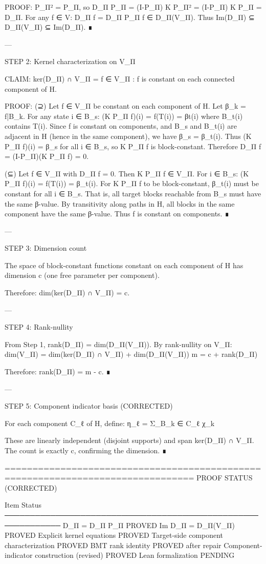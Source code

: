 PROOF: P_Π² = P_Π, so D_Π P_Π = (I-P_Π) K P_Π² = (I-P_Π) K P_Π = D_Π.
For any f ∈ V: D_Π f = D_Π P_Π f ∈ D_Π(V_Π).
Thus Im(D_Π) ⊆ D_Π(V_Π) ⊆ Im(D_Π). ∎


---

STEP 2: Kernel characterization on V_Π

CLAIM: ker(D_Π) ∩ V_Π = {f ∈ V_Π : f is constant on each connected component of H}.

PROOF:
(⊇) Let f ∈ V_Π be constant on each component of H. Let β_k = f|{B_k}.
For any state i ∈ B_s: (K P_Π f)(i) = f(T(i)) = β{t(i)} where B_{t(i)} contains T(i).
Since f is constant on components, and B_s and B_{t(i)} are adjacent in H
(hence in the same component), we have β_s = β_{t(i)}.
Thus (K P_Π f)(i) = β_s for all i ∈ B_s, so K P_Π f is block-constant.
Therefore D_Π f = (I-P_Π)(K P_Π f) = 0.

(⊆) Let f ∈ V_Π with D_Π f = 0. Then K P_Π f ∈ V_Π.
For i ∈ B_s: (K P_Π f)(i) = f(T(i)) = β_{t(i)}.
For K P_Π f to be block-constant, β_{t(i)} must be constant for all i ∈ B_s.
That is, all target blocks reachable from B_s must have the same β-value.
By transitivity along paths in H, all blocks in the same component have the
same β-value. Thus f is constant on components. ∎


---

STEP 3: Dimension count

The space of block-constant functions constant on each component of H has
dimension c (one free parameter per component).

Therefore: dim(ker(D_Π) ∩ V_Π) = c.


---

STEP 4: Rank-nullity

From Step 1, rank(D_Π) = dim(D_Π(V_Π)).
By rank-nullity on V_Π:
dim(V_Π) = dim(ker(D_Π) ∩ V_Π) + dim(D_Π(V_Π))
m = c + rank(D_Π)

Therefore: rank(D_Π) = m - c. ∎


---

STEP 5: Component indicator basis (CORRECTED)

For each component C_ℓ of H, define:
η_ℓ = Σ_{B_k ∈ C_ℓ} χ_k

These are linearly independent (disjoint supports) and span ker(D_Π) ∩ V_Π.
The count is exactly c, confirming the dimension. ∎

================================================================================
PROOF STATUS (CORRECTED)

Item                                          Status
─────────────────────────────────────────────────────────────
D_Π = D_Π P_Π                                 PROVED
Im D_Π = D_Π(V_Π)                             PROVED
Explicit kernel equations                       PROVED
Target-side component characterization          PROVED
BMT rank identity                               PROVED after repair
Component-indicator construction (revised)      PROVED
Lean formalization                              PENDING

